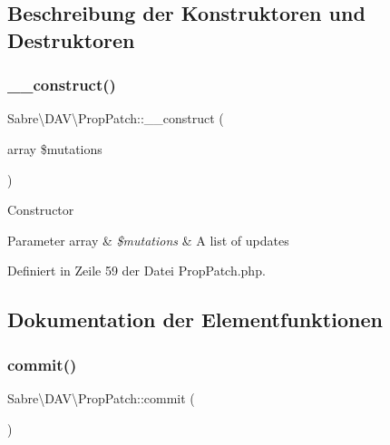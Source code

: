 \subsection{Beschreibung der Konstruktoren und Destruktoren}
\mbox{\label{class_sabre_1_1_d_a_v_1_1_prop_patch_a8e9765d3a06e62c02c7d456783a92b64}} 
\subsubsection{\texorpdfstring{\+\_\+\+\_\+construct()}{\_\_construct()}}
{\footnotesize\ttfamily Sabre\textbackslash{}\+D\+A\+V\textbackslash{}\+Prop\+Patch\+::\+\_\+\+\_\+construct (\begin{DoxyParamCaption}\item[{array}]{\$mutations }\end{DoxyParamCaption})}

Constructor


\begin{DoxyParams}[1]{Parameter}
array & {\em \$mutations} & A list of updates \\
\hline
\end{DoxyParams}


Definiert in Zeile 59 der Datei Prop\+Patch.\+php.



\subsection{Dokumentation der Elementfunktionen}
\mbox{\label{class_sabre_1_1_d_a_v_1_1_prop_patch_a17d4198c780f4b4e1bb36943506d67e1}} 
\subsubsection{\texorpdfstring{commit()}{commit()}}
{\footnotesize\ttfamily Sabre\textbackslash{}\+D\+A\+V\textbackslash{}\+Prop\+Patch\+::commit (\begin{DoxyParamCaption}{ }\end{DoxyParamCaption})}

